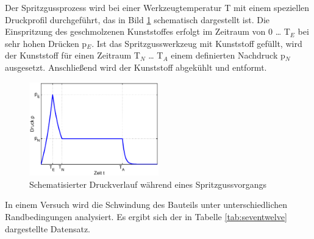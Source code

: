 \noindent Der Spritzgussprozess wird bei einer Werkzeugtemperatur T mit einem speziellen Druckprofil durchgef\"{u}hrt, das in Bild \ref{fig:Spritzgussprozess1} schematisch dargestellt ist. Die Einspritzung des geschmolzenen Kunststoffes erfolgt im Zeitraum von 0 {\dots} T$_{E}$ bei sehr hohen Dr\"{u}cken p$_{E}$. Ist das Spritzgusswerkzeug mit Kunststoff gef\"{u}llt, wird der Kunststoff f\"{u}r einen Zeitraum T$_{N}$ {\dots} T$_{A}$ einem definierten Nachdruck p$_{N}$ ausgesetzt. Anschlie{\ss}end wird der Kunststoff abgek\"{u}hlt und entformt. 

\noindent 
\begin{figure}[H]
  \centerline{\includegraphics[width=0.5\textwidth]{Kapitel7/Bilder/image11}}
  \caption{Schematisierter Druckverlauf w\"{a}hrend eines Spritzgussvorgangs}
  \label{fig:Spritzgussprozess1}
\end{figure}

\noindent In einem Versuch wird die Schwindung des Bauteils unter unterschiedlichen Randbedingungen analysiert. Es ergibt sich der in Tabelle \ref{tab:seventwelve} dargestellte Datensatz.

